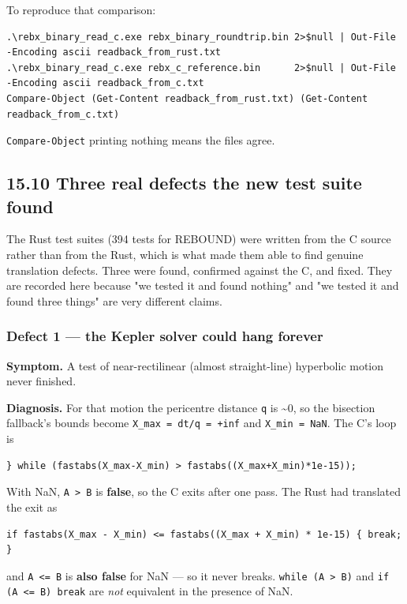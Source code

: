 \documentclass[11pt]{article}
\begin{document}
To reproduce that comparison:

\begin{lstlisting}
.\rebx_binary_read_c.exe rebx_binary_roundtrip.bin 2>$null | Out-File -Encoding ascii readback_from_rust.txt
.\rebx_binary_read_c.exe rebx_c_reference.bin      2>$null | Out-File -Encoding ascii readback_from_c.txt
Compare-Object (Get-Content readback_from_rust.txt) (Get-Content readback_from_c.txt)
\end{lstlisting}

\texttt{Compare-Object} printing nothing means the files agree.

\subsection{15.10 Three real defects the new test suite found}

The Rust test suites (394 tests for REBOUND) were written from the C source rather than from the Rust, which is what made them able to find genuine translation defects. Three were found, confirmed against the C, and fixed. They are recorded here because "we tested it and found nothing" and "we tested it and found three things" are very different claims.

\subsubsection{Defect 1 --- the Kepler solver could hang forever}

\textbf{Symptom.} A test of near-rectilinear (almost straight-line) hyperbolic motion never finished.

\textbf{Diagnosis.} For that motion the pericentre distance \texttt{q} is \textasciitilde{}0, so the bisection fallback's bounds become \texttt{X\_max = dt/q = +inf} and \texttt{X\_min = NaN}. The C's loop is

\begin{lstlisting}
} while (fastabs(X_max-X_min) > fastabs((X_max+X_min)*1e-15));
\end{lstlisting}

With NaN, \texttt{A > B} is \textbf{false}, so the C exits after one pass. The Rust had translated the exit as

\begin{lstlisting}
if fastabs(X_max - X_min) <= fastabs((X_max + X_min) * 1e-15) { break; }
\end{lstlisting}

and \texttt{A <= B} is \textbf{also false} for NaN --- so it never breaks. \texttt{while (A > B)} and \texttt{if (A <= B) break} are \emph{not} equivalent in the presence of NaN.
\end{document}
